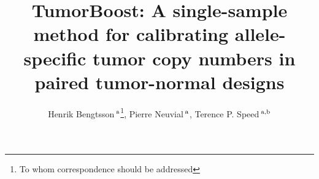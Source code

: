 \documentclass[draft]{bioinfo}
\begin{document}

\title[TumorBoost]{TumorBoost: A single-sample method for calibrating allele-specific tumor copy numbers in paired tumor-normal designs}
\author[Bengtsson et al.]{Henrik Bengtsson\,$^{\rm a}$\footnote{To whom correspondence should be addressed}, Pierre Neuvial\,$^{\rm a}$, Terence P. Speed\,$^{\rm a,b}$}
\address{
  $^{\rm a}$ Department of Statistics, University of California, Berkeley, USA.
  $^{\rm b}$ Bioinformatics Division, Walter \& Eliza Hall Institute of Medical Research, Parkville, Australia.
} 



\maketitle
\end{document}
